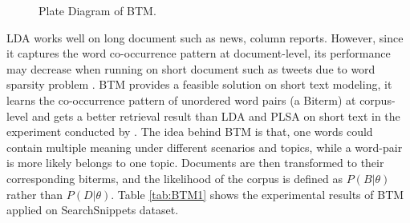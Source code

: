 \begin{figure}[!htp]
    \centering
    \caption{Plate Diagram of BTM.\cite{yan2013biterm}}
    \label{fig:btm}
\end{figure}
LDA works well on long document such as news, column reports. However, since it captures the word co-occurrence pattern at document-level, its performance may decrease when running on short document such as tweets due to word sparsity problem \cite{yan2013biterm}. BTM provides a feasible solution on short text modeling, it learns the co-occurrence pattern of unordered word pairs (a Biterm) at corpus-level and gets a better retrieval result than LDA and PLSA on short text in the experiment conducted by \cite{yan2013biterm}. The idea behind BTM is that, one words could contain multiple meaning under different scenarios and topics, while a word-pair is more likely belongs to one topic. Documents are then transformed to their corresponding biterms, and the likelihood of the corpus is defined as $P(B|\theta)$ rather than $P(D|\theta)$. 
Table \ref{tab:BTM1} shows the experimental results of BTM applied on SearchSnippets dataset.
